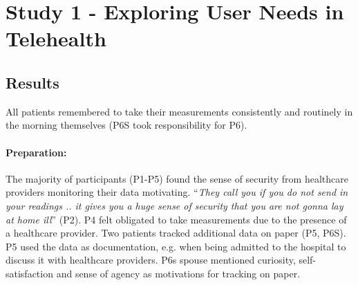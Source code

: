 \section{Study 1 - Exploring User Needs in Telehealth}

\subsection{Results}
All patients remembered to take their measurements consistently and routinely in the morning themselves (P6S took responsibility for P6). 

\paragraph{Preparation:} 
The majority of participants (P1-P5) found the sense of security from healthcare providers monitoring their data motivating. “\textit{They call you if you do not send in your readings .. it gives you a huge sense of security that you are not gonna lay at home ill}” (P2). P4 felt obligated to take measurements due to the presence of a healthcare provider. Two patients tracked additional data on paper (P5, P6S). P5 used the data as documentation, e.g. when being admitted to the hospital to discuss it with healthcare providers. P6s spouse mentioned curiosity, self-satisfaction and sense of agency as motivations for tracking on paper. 

